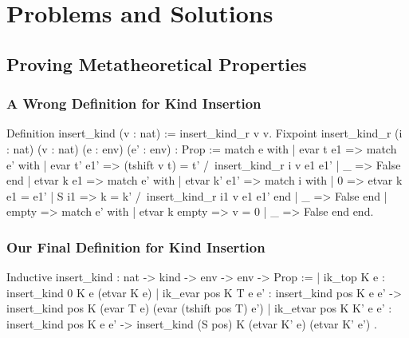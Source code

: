 \documentclass{beamer}
\begin{document}
\section{Problems and Solutions}

\subsection{Proving Metatheoretical Properties}

\begin{frame}[fragile]
\frametitle{A Wrong Definition for Kind Insertion}

\begin{pyglist}[fontsize=\scriptsize]
Definition insert_kind (v : nat) := insert_kind_r v v.
Fixpoint insert_kind_r (i : nat) (v : nat) (e : env) (e' : env) : Prop :=
match e with
| evar t e1 => match e' with
               | evar t' e1' =>
                   (tshift v t) = t' /\ insert_kind_r i v e1 e1'
               | _ => False
               end
| etvar k e1 => match e' with
                | etvar k' e1' => match i with
                                  | 0 => etvar k e1 = e1'
                                  | S i1 =>
                                      k = k' /\ insert_kind_r i1 v e1 e1'
                                  end
                | _ => False
                end
  | empty => match e' with
             | etvar k empty => v = 0
             | _ => False
             end
end.
\end{pyglist}

\end{frame}

\begin{frame}[fragile]
\frametitle{Our Final Definition for Kind Insertion}

\begin{pyglist}
Inductive insert_kind : nat -> kind -> env -> env -> Prop :=
| ik_top K e :
    insert_kind 0 K e (etvar K e)
| ik_evar pos K T e e' :
    insert_kind pos K e e' ->
    insert_kind pos K (evar T e) (evar (tshift pos T) e')
| ik_etvar pos K K' e e' :
    insert_kind pos K e e' ->
    insert_kind (S pos) K (etvar K' e) (etvar K' e')
.
\end{pyglist}

\end{frame}
\end{document}
